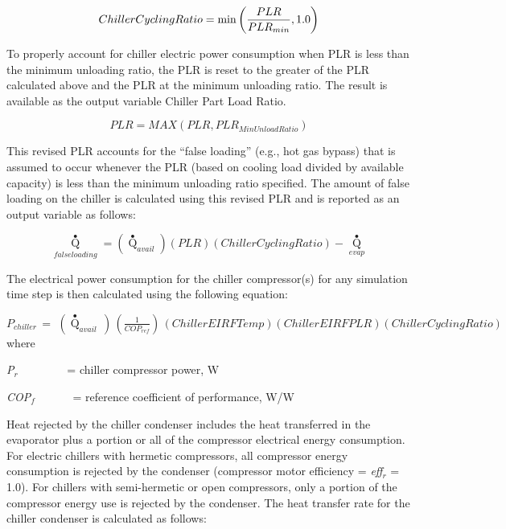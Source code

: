 \begin{equation}
  ChillerCyclingRatio = \min\PB{\frac{PLR}{PLR_{min}},1.0}
\end{equation}

To properly account for chiller electric power consumption when PLR is less than the minimum unloading ratio, the PLR is reset to the greater of the PLR calculated above and the PLR at the minimum unloading ratio. The result is available as the output variable Chiller Part Load Ratio.

\begin{equation}
PLR = MAX(PLR,PL{R_{MinUnloadRatio}})
\end{equation}

This revised PLR accounts for the ``false loading'' (e.g., hot gas bypass) that is assumed to occur whenever the PLR (based on cooling load divided by available capacity) is less than the minimum unloading ratio specified. The amount of false loading on the chiller is calculated using this revised PLR and is reported as an output variable as follows:

\begin{equation}
{\mathop Q\limits^ \bullet_{falseloading}} = \left( {{{\mathop Q\limits^ \bullet  }_{avail}}} \right)\left( {PLR} \right)\left( {ChillerCyclingRatio} \right) - {\mathop Q\limits^ \bullet_{evap}}
\end{equation}

The electrical power consumption for the chiller compressor(s) for any simulation time step is then calculated using the following equation:

\({P_{chiller}}\, = \,\,\left( {{{\mathop Q\limits^ \bullet }_{avail}}\,} \right)\,\left( {\frac{1}{{CO{P_{ref}}}}} \right)\,\left( {ChillerEIRFTemp} \right)\left( {ChillerEIRFPLR} \right)\left( {ChillerCyclingRatio} \right)\) where

\emph{P\(_{r}\)}~~~~~~~~ = chiller compressor power, W

\emph{COP\(_{f}\)}~~~~~~ = reference coefficient of performance, W/W

Heat rejected by the chiller condenser includes the heat transferred in the evaporator plus a portion or all of the compressor electrical energy consumption. For electric chillers with hermetic compressors, all compressor energy consumption is rejected by the condenser (compressor motor efficiency = \emph{eff\(_{r}\)} = 1.0). For chillers with semi-hermetic or open compressors, only a portion of the compressor energy use is rejected by the condenser. The heat transfer rate for the chiller condenser is calculated as follows:

